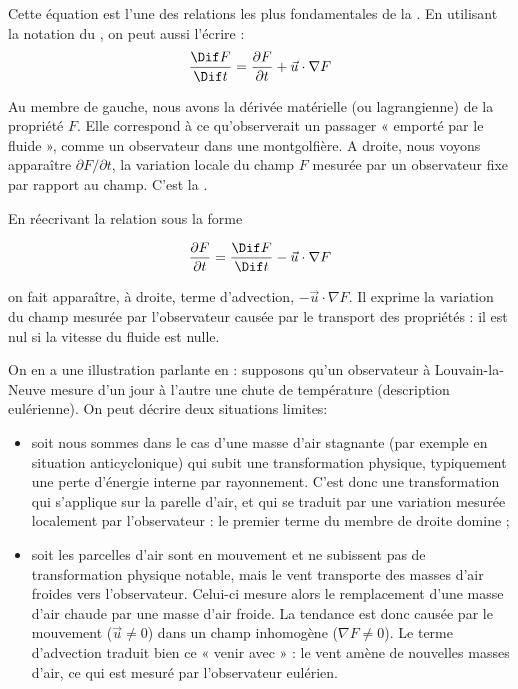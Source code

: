 Cette équation est l’une des relations les plus fondamentales de la .  
En utilisant la notation du , on peut aussi l’écrire :
\begin{equation}
\frac{\Dif F}{\Dif t} = \frac{\partial F}{\partial t} + \vec{u} \cdot \nabla F
\label{eq:material_derivative_gradient}
\end{equation}

Au membre de gauche, nous avons la dérivée matérielle (ou lagrangienne) de la propriété $F$.  Elle correspond à ce qu’observerait un passager « emporté par le fluide », comme un observateur dans une montgolfière. 
A droite, nous voyons apparaître $\partial F / \partial t$, la variation locale du champ $F$ mesurée par un observateur fixe par rapport au champ. C’est la . 

En réecrivant la relation sous la forme

\begin{equation}
\frac{\partial F}{\partial t} = \frac{\Dif F}{\Dif t} - \vec{u} \cdot \nabla F
\label{eq:eulerianagrangian}
\end{equation}

on fait apparaître, à droite,  terme d’advection, $-\vec{u}\cdot\nabla F$. Il  exprime la variation du champ mesurée par l’observateur causée par le transport des propriétés : il est nul si la vitesse du fluide est nulle.

On en a une illustration parlante en  : supposons qu’un observateur à Louvain-la-Neuve mesure d’un jour à l’autre une chute de température (description eulérienne). On peut décrire deux situations limites:
\begin{itemize}
\item soit nous sommes dans le cas d’une masse d’air stagnante (par exemple en situation anticyclonique) qui subit une transformation physique, typiquement une perte d’énergie interne par rayonnement. C’est donc une transformation qui s’applique sur la parelle  d’air, et qui se traduit par une variation mesurée localement par l’observateur : le premier terme du membre de droite domine ;
\item soit les parcelles d’air sont en mouvement et ne subissent pas de transformation physique notable, mais le vent transporte des masses d’air froides vers l’observateur. Celui-ci mesure alors le remplacement d’une masse d’air chaude par une masse d’air froide. La tendance est donc causée par le mouvement ($\vec{u} \neq 0$) dans un champ inhomogène ($\nabla F \neq 0$). Le terme d’advection traduit bien ce « venir avec » : le vent amène de nouvelles masses d’air, ce qui est mesuré par l’observateur eulérien.
\end{itemize}

